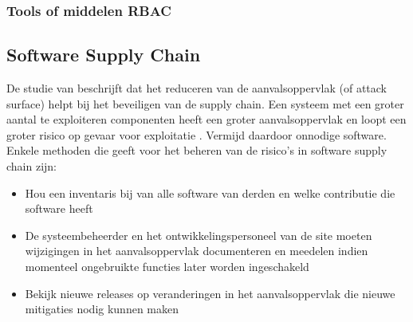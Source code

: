 \subsubsection{Tools of middelen RBAC}


\subsection{Software Supply Chain}
De studie van \textcite{ellison2010evaluating} beschrijft dat het reduceren van de aanvalsoppervlak (of attack surface) helpt bij het beveiligen van de supply chain. Een systeem met een groter aantal te exploiteren componenten heeft een groter aanvalsoppervlak en loopt een groter risico op gevaar voor exploitatie \autocite{ellison2010evaluating}. Vermijd daardoor onnodige software. Enkele methoden die \textcite{ellison2010evaluating} geeft voor het beheren van de risico's in software supply chain zijn:
\begin{itemize}
    \item Hou een inventaris bij van alle software van derden en welke contributie die software heeft
    \item De systeembeheerder en het ontwikkelingspersoneel van de site moeten wijzigingen in het aanvalsoppervlak documenteren en meedelen indien momenteel ongebruikte functies later worden ingeschakeld
    \item Bekijk nieuwe releases op veranderingen in het aanvalsoppervlak die nieuwe mitigaties nodig kunnen maken
\end{itemize}

